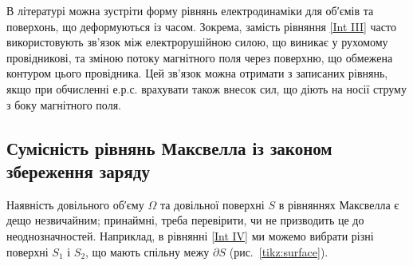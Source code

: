 В літературі можна зустріти форму рівнянь електродинаміки для об′ємів та поверхонь, що деформуються із часом. Зокрема, замість рівняння \eqref{Int III}
часто використовують зв’язок між електрорушійною силою, що виникає у рухомому провідникові, та зміною потоку магнітного поля через поверхню, що обмежена
контуром цього провідника. Цей зв’язок можна отримати з записаних рівнянь, якщо при обчисленні е.р.с. врахувати також внесок сил, що діють на носії
струму з боку магнітного поля.


\subsection*{Сумісність рівнянь Максвелла із законом збереження заряду}


Наявність довільного об′єму $\Omega$ та довільної поверхні $S$ в рівняннях Максвелла є дещо незвичайним; принаймні,
треба перевірити, чи не призводить це до неоднозначностей. Наприклад, в рівнянні \eqref{Int IV} ми можемо вибрати різні поверхні $S_1$ і
$S_2$, що мають спільну межу $\partial S$ (рис.~\ref{tikz:surface}).
\begin{SCfigure}[][h!]
	\centering
{}
\caption{}
\label{tikz:surface}
\end{SCfigure}

